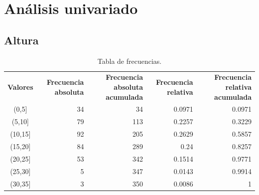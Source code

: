 \documentclass[11pt]{article}
\begin{document}

\newpage
\section{Análisis univariado}

\subsection{Altura}

\begin{table}[h!]
  \begin{center}
    \begin{tabular}{| c | r | r | r | r |}
      \hline
      \multirow{3}{*}{\textbf{Valores}} & 
      \multirow{3}{3cm}{\centering\textbf{Frecuencia absoluta}} & 
      \multirow{3}{3cm}{\centering\textbf{Frecuencia absoluta acumulada}} &
      \multirow{3}{3cm}{\centering\textbf{Frecuencia relativa}} & 
      \multirow{3}{3cm}{\centering\textbf{Frecuencia relativa acumulada}} \\
      & & & & \\
      & & & & \\ \hline
      (0,5] & 34 & 34 & 0.0971 & 0.0971 \\ \hline
      (5,10] & 79 & 113 & 0.2257 & 0.3229 \\ \hline
      (10,15] & 92 & 205 & 0.2629 & 0.5857 \\ \hline
      (15,20] & 84 & 289 & 0.24 & 0.8257 \\ \hline
      (20,25] & 53 & 342 & 0.1514 & 0.9771 \\ \hline
      (25,30] & 5 & 347 & 0.0143 & 0.9914 \\ \hline
      (30,35] & 3 & 350 & 0.0086 & 1 \\ \hline
    \end{tabular}
    \caption{Tabla de frecuencias.}
    \label{tab:tablaAltura}
  \end{center}
\end{table}
\end{document}
